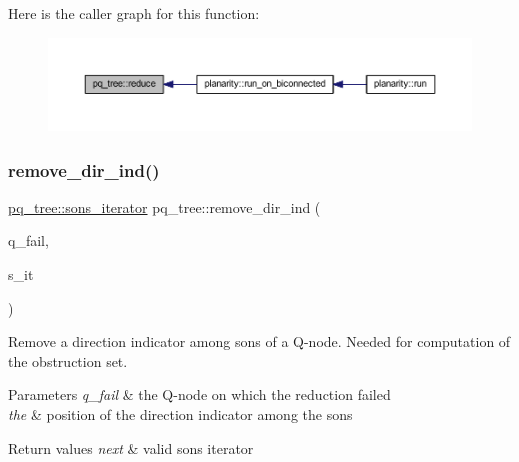 Here is the caller graph for this function\+:\nopagebreak
\begin{figure}[H]
\begin{center}
\leavevmode
\includegraphics[width=350pt]{classpq__tree_a390598b675cb86952ab8cfb444056eb8_icgraph}
\end{center}
\end{figure}
\mbox{\label{classpq__tree_a68737f5cebd17670d9b73b797ca01a74}} 
\subsubsection{\texorpdfstring{remove\+\_\+dir\+\_\+ind()}{remove\_dir\_ind()}}
{\footnotesize\ttfamily \mbox{\hyperlink{classpq__tree_ab47263066d4b0acc70e00043870d748a}{pq\+\_\+tree\+::sons\+\_\+iterator}} pq\+\_\+tree\+::remove\+\_\+dir\+\_\+ind (\begin{DoxyParamCaption}\item[{\mbox{\hyperlink{classq__node}{q\+\_\+node}} $\ast$}]{q\+\_\+fail,  }\item[{\mbox{\hyperlink{classpq__tree_ab47263066d4b0acc70e00043870d748a}{sons\+\_\+iterator}}}]{s\+\_\+it }\end{DoxyParamCaption})}



Remove a direction indicator among sons of a Q-\/node. Needed for computation of the obstruction set. 


\begin{DoxyParams}{Parameters}
{\em q\+\_\+fail} & the Q-\/node on which the reduction failed \\
\hline
{\em the} & position of the direction indicator among the sons\\
\hline
\end{DoxyParams}

\begin{DoxyRetVals}{Return values}
{\em next} & valid sons iterator \\
\hline
\end{DoxyRetVals}


